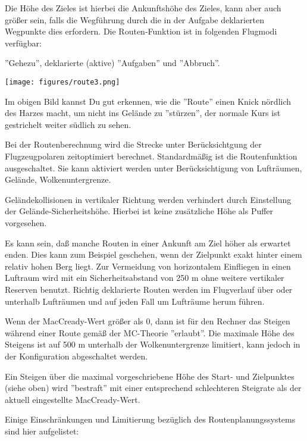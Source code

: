 Die Höhe des Zieles ist hierbei die Ankunftshöhe des Zieles, kann aber auch größer sein, falls die Wegführung durch die in der Aufgabe deklarierten Wegpunkte dies erfordern. Die Routen-Funktion ist in folgenden Flugmodi verfügbar:

''Gehezu'', deklarierte (aktive) ''Aufgaben'' und ''Abbruch''.

\begin{center}
\texttt{[image: figures/route3.png]}
\end{center}

Im obigen Bild kannst Du gut erkennen, wie die ''Route'' einen Knick nördlich des Harzes macht, um nicht ins Gelände zu ''stürzen'', der normale Kurs ist gestrichelt weiter südlich zu sehen. 

Bei der Routenberechnung wird die Strecke unter Berücksichtgung der Flugzeugpolaren zeitoptimiert berechnet. Standardmäßig ist die Routenfunktion ausgeschaltet. Sie kann aktiviert werden unter   Berücksichtigung von Lufträumen, Gelände, Wolkenuntergrenze.

Geländekollisionen in vertikaler Richtung werden verhindert durch Einstellung der Gelände-Sicherheitshöhe.  Hierbei ist keine zusätzliche Höhe als Puffer vorgesehen.

Es kann sein, daß manche Routen in einer Ankunft am Ziel höher als erwartet enden. Dies kann zum Beispiel geschehen, wenn der Zielpunkt exakt hinter einem relativ hohen Berg liegt. Zur Vermeidung von horizontalem Einfliegen in einen Luftraum wird mit ein Sicherheitsabstand von 250 m ohne weitere vertikaler Reserven benutzt.
Richtig deklarierte Routen werden im Flugverlauf über oder unterhalb Lufträumen und auf jeden Fall um Lufträume herum führen.

\warning
Wenn der MacCready-Wert größer als 0, dann ist für den Rechner das Steigen während einer Route gemäß der MC-Theorie ''erlaubt''.   Die maximale Höhe des Steigens  ist auf  500 m unterhalb der Wolkenuntergrenze limitiert, kann jedoch in der Konfiguration abgeschaltet werden.

Ein Steigen über die maximal vorgeschriebene Höhe des Start- und Zielpunktes (siehe oben) wird ''bestraft'' mit einer entsprechend schlechteren Steigrate als der aktuell eingestellte MacCready-Wert. 


Einige Einschränkungen und Limitierung bezüglich des Routenplanungssystems sind hier aufgelistet:

